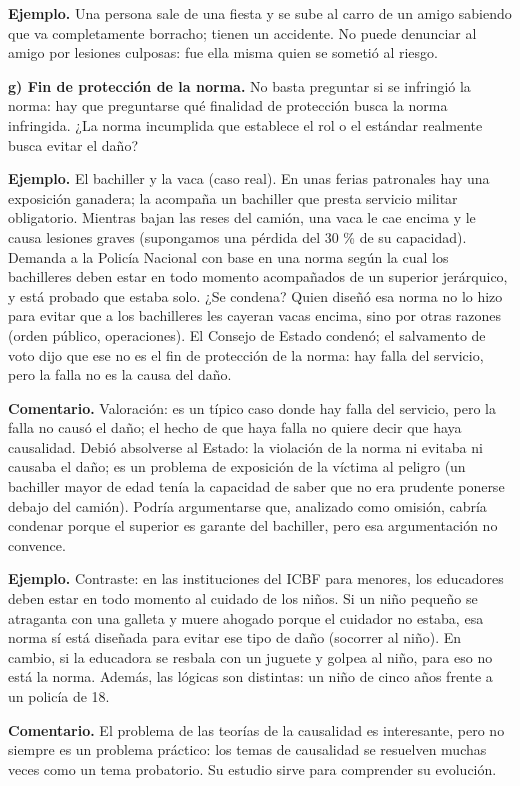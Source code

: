 \begin{ejemplo}
\textcolor[HTML]{4F6228}{\textbf{Ejemplo. }}Una persona sale de una fiesta y se sube al carro de un amigo sabiendo que va completamente borracho; tienen un accidente. No puede denunciar al amigo por lesiones culposas: fue ella misma quien se sometió al riesgo.
\end{ejemplo}
\textbf{g) Fin de protección de la norma.} No basta preguntar si se infringió la norma: hay que preguntarse qué finalidad de protección busca la norma infringida. ¿La norma incumplida que establece el rol o el estándar realmente busca evitar el daño?

\begin{ejemplo}
\textcolor[HTML]{4F6228}{\textbf{Ejemplo. }}El bachiller y la vaca (caso real). En unas ferias patronales hay una exposición ganadera; la acompaña un bachiller que presta servicio militar obligatorio. Mientras bajan las reses del camión, una vaca le cae encima y le causa lesiones graves (supongamos una pérdida del 30 \% de su capacidad). Demanda a la Policía Nacional con base en una norma según la cual los bachilleres deben estar en todo momento acompañados de un superior jerárquico, y está probado que estaba solo. ¿Se condena? Quien diseñó esa norma no lo hizo para evitar que a los bachilleres les cayeran vacas encima, sino por otras razones (orden público, operaciones). El Consejo de Estado condenó; el salvamento de voto dijo que ese no es el fin de protección de la norma: hay falla del servicio, pero la falla no es la causa del daño.
\end{ejemplo}
\begin{comentario}
\textcolor[HTML]{8A6D3B}{\textbf{Comentario. }}Valoración: es un típico caso donde hay falla del servicio, pero la falla no causó el daño; el hecho de que haya falla no quiere decir que haya causalidad. Debió absolverse al Estado: la violación de la norma ni evitaba ni causaba el daño; es un problema de exposición de la víctima al peligro (un bachiller mayor de edad tenía la capacidad de saber que no era prudente ponerse debajo del camión). Podría argumentarse que, analizado como omisión, cabría condenar porque el superior es garante del bachiller, pero esa argumentación no convence.
\end{comentario}
\begin{ejemplo}
\textcolor[HTML]{4F6228}{\textbf{Ejemplo. }}Contraste: en las instituciones del ICBF para menores, los educadores deben estar en todo momento al cuidado de los niños. Si un niño pequeño se atraganta con una galleta y muere ahogado porque el cuidador no estaba, esa norma sí está diseñada para evitar ese tipo de daño (socorrer al niño). En cambio, si la educadora se resbala con un juguete y golpea al niño, para eso no está la norma. Además, las lógicas son distintas: un niño de cinco años frente a un policía de 18.
\end{ejemplo}
\begin{comentario}
\textcolor[HTML]{8A6D3B}{\textbf{Comentario. }}El problema de las teorías de la causalidad es interesante, pero no siempre es un problema práctico: los temas de causalidad se resuelven muchas veces como un tema probatorio. Su estudio sirve para comprender su evolución.
\end{comentario}
